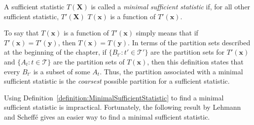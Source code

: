 \begin{definition} \label{definition:MinimalSufficientStatistic}
A sufficient statistic $T(\mathbf{X})$ is called a \emph{minimal sufficient statistic} if, for all other sufficient statistic, $T'(\mathbf{X})$ $T(\mathbf{x})$ is a function of $T'(\mathbf{x})$.
\end{definition}

To say that $T(\mathbf{x})$ is a function of $T'(\mathbf{x})$ simply means that if $T'(\mathbf{x}) = T'(\mathbf{y})$, then $T(\mathbf{x}) = T(\mathbf{y})$.
In terms of the partition sets described at the beginning of the chapter, if $\{ B_{t'}:t' \in \mathcal{T}'\}$ are the partition sets for $T'(\mathbf{x})$ and $\{ A_t : t \in \mathcal{T} \}$ are the partition sets of $T(\mathbf{x})$, then this definition states that every $B_{t'}$ is a subset of some $A_{t}$.
Thus, the partition associated with a minimal sufficient statistic is the \emph{coarsest} possible partition for a sufficient statistic.


Using Definition~\ref{definition:MinimalSufficientStatistic} to find a minimal sufficient statistic is impractical.
Fortunately, the following result by Lehmann and Scheff\'{e} gives an easier way to find a minimal sufficient statistic.

